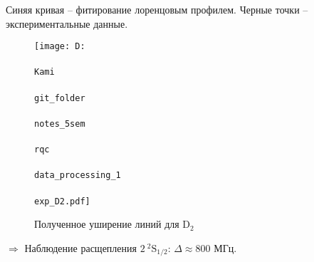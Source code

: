 Синяя кривая -- фитирование лоренцовым профилем.
Черные точки -- экспериментальные данные.

\begin{figure}[h]
    \centering
    \texttt{[image: D:\\\\Kami\\\\git\_folder\\\\notes\_5sem\\\\rqc\\\\data\_processing\_1\\\\exp\_D2.pdf]}
    \caption{Полученное уширение линий для D${}_2$}
    \label{fig:expD2}
\end{figure}

\vspace{-2mm}
$\Rightarrow$ Наблюдение расщепления $2 \ {}^2\text{S}_{1/2}$: $\Delta \approx 800$ МГц.